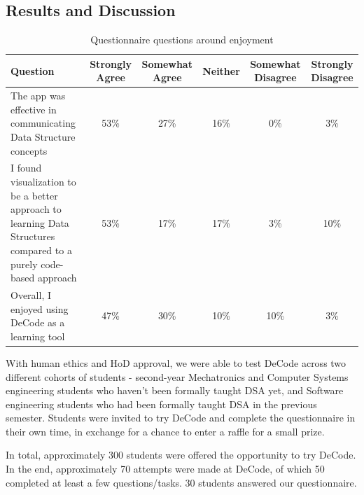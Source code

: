 \documentclass[11pt]{article}
\begin{document}
\subsection{Results and Discussion}
\begin{table}[]
  \small
  \begin{tabulary}{\linewidth}{|L|C|C|C|C|C|}
  \hline
  \textbf{Question}                                                                                                  & \textbf{Strongly Agree} & \textbf{Somewhat Agree} & \textbf{Neither} & \textbf{Somewhat Disagree} & \textbf{Strongly Disagree} \\ \hline
  The app was effective in communicating Data Structure concepts                                                     & 53\%                    & 27\%                    & 16\%             & 0\%                        & 3\%                        \\ \hline
  I found visualization to be a better approach to learning Data Structures compared to a purely code-based approach & 53\%                    & 17\%                    & 17\%             & 3\%                        & 10\%                       \\ \hline
  Overall, I enjoyed using DeCode as a learning tool                                                                 & 47\%                    & 30\%                    & 10\%             & 10\%                       & 3\%                        \\ \hline
  \end{tabulary}
  \caption{Questionnaire questions around enjoyment}
  \label{tab:enjoytable}
\end{table}
With human ethics and HoD approval, we were able to test DeCode across two different cohorts of students - second-year Mechatronics and Computer Systems engineering students who haven't been formally taught DSA yet, and Software engineering students who had been formally taught DSA in the previous semester. Students were invited to try DeCode and complete the questionnaire in their own time, in exchange for a chance to enter a raffle for a small prize.\par
In total, approximately 300 students were offered the opportunity to try DeCode. In the end, approximately 70 attempts were made at DeCode, of which 50 completed at least a few questions/tasks. 30 students answered our questionnaire.
\end{document}
